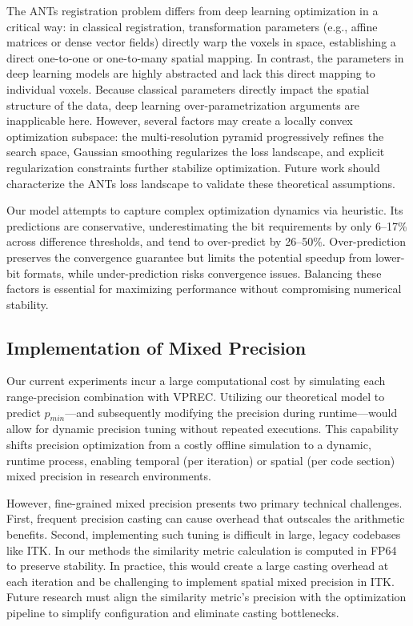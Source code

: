 \documentclass[journal,twoside,web]{ieeecolor}
\begin{document}
The ANTs registration problem differs from deep learning optimization in a critical way: in classical registration, transformation parameters (e.g., affine matrices or dense vector fields) directly warp the voxels in space, establishing a direct one-to-one or one-to-many spatial mapping. In contrast, the parameters in deep learning models are highly abstracted and lack this direct mapping to individual voxels. Because classical parameters directly impact the spatial structure of the data, deep learning over-parametrization arguments are inapplicable here. However, several factors may create a locally convex optimization subspace: the multi-resolution pyramid progressively refines the search space, Gaussian smoothing regularizes the loss landscape, and explicit regularization constraints further stabilize optimization. Future work should characterize the ANTs loss landscape to validate these theoretical assumptions.

Our model attempts to capture complex optimization dynamics via heuristic. Its predictions are conservative, underestimating the bit requirements by only 6--17\% across difference thresholds, and tend to over-predict by 26--50\%. Over-prediction preserves the convergence guarantee but limits the potential speedup from lower-bit formats, while under-prediction risks convergence issues. Balancing these factors is essential for maximizing performance without compromising numerical stability.

\subsection{Implementation of Mixed Precision}
Our current experiments incur a large computational cost by simulating each range-precision combination with VPREC. Utilizing our theoretical model to predict $p_{min}$---and subsequently modifying the precision during runtime---would allow for dynamic precision tuning without repeated executions. This capability shifts precision optimization from a costly offline simulation to a dynamic, runtime process, enabling temporal (per iteration) or spatial (per code section) mixed precision in research environments.

However, fine-grained mixed precision presents two primary technical challenges. First, frequent precision casting can cause overhead that outscales the arithmetic benefits. Second, implementing such tuning is difficult in large, legacy codebases like ITK. In our methods the similarity metric calculation is computed in FP64 to preserve stability. In practice, this would create a large casting overhead at each iteration and be challenging to implement spatial mixed precision in ITK. Future research must align the similarity metric's precision with the optimization pipeline to simplify configuration and eliminate casting bottlenecks.
\end{document}
